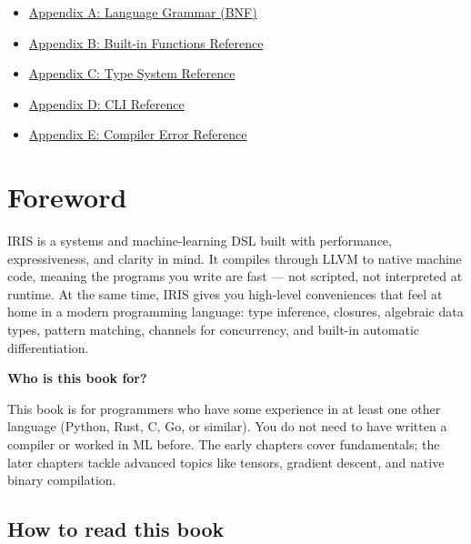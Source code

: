 \documentclass[
  english,
]{book}
\providecommand{\tightlist}{%
  \setlength{\itemsep}{0pt}\setlength{\parskip}{0pt}}
\begin{document}
\begin{itemize}
  \begin{itemize}
  \tightlist
  \item
    \hyperref[211-the-sandbox-flag]{21.1 The Sandbox Flag}
  \item
    \hyperref[212-restricted-operations]{21.2 Restricted Operations}
  \item
    \hyperref[213-customizing-whitelists]{21.3 Customizing Whitelists}
  \item
    \hyperref[try-it-yourself]{Try It Yourself}
  \end{itemize}
\item
  \hyperref[appendix-a-language-grammar-bnf]{Appendix A: Language
  Grammar (BNF)}
\item
  \hyperref[appendix-b-built-in-functions-reference]{Appendix B:
  Built-in Functions Reference}
\item
  \hyperref[appendix-c-type-system-reference]{Appendix C: Type System
  Reference}
\item
  \hyperref[appendix-d-cli-reference]{Appendix D: CLI Reference}
\item
  \hyperref[appendix-e-compiler-error-reference]{Appendix E: Compiler
  Error Reference}
\end{itemize}

\section{Foreword}\label{foreword}

IRIS is a systems and machine-learning DSL built with performance,
expressiveness, and clarity in mind. It compiles through LLVM to native
machine code, meaning the programs you write are fast --- not scripted,
not interpreted at runtime. At the same time, IRIS gives you high-level
conveniences that feel at home in a modern programming language: type
inference, closures, algebraic data types, pattern matching, channels
for concurrency, and built-in automatic differentiation.

\textbf{Who is this book for?}

This book is for programmers who have some experience in at least one
other language (Python, Rust, C, Go, or similar). You do not need to
have written a compiler or worked in ML before. The early chapters cover
fundamentals; the later chapters tackle advanced topics like tensors,
gradient descent, and native binary compilation.

\subsection{How to read this book}\label{how-to-read-this-book}
\end{document}
